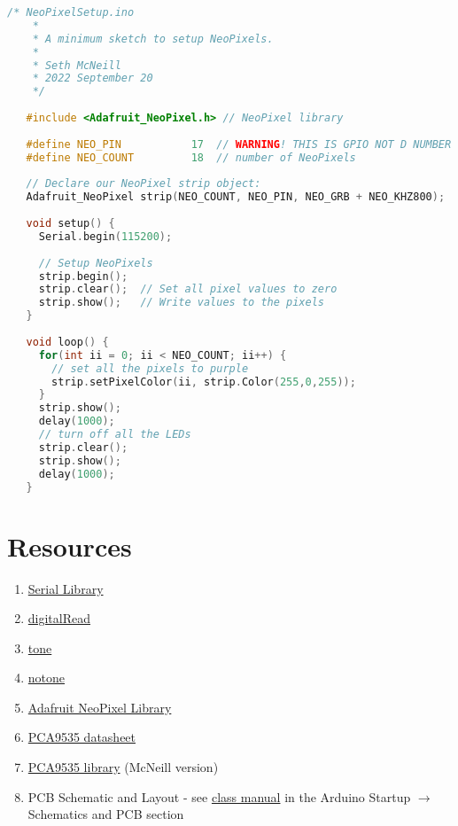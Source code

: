 \begin{lstlisting}[language=C++, caption={This snippet shows how to setup and run the NeoPixels on the board.},label={lst:neopixelsetup}]
    /* NeoPixelSetup.ino
    * 
    * A minimum sketch to setup NeoPixels.
    * 
    * Seth McNeill
    * 2022 September 20
    */
   
   #include <Adafruit_NeoPixel.h> // NeoPixel library
   
   #define NEO_PIN           17  // WARNING! THIS IS GPIO NOT D NUMBER for NeoPixels
   #define NEO_COUNT         18  // number of NeoPixels
   
   // Declare our NeoPixel strip object:
   Adafruit_NeoPixel strip(NEO_COUNT, NEO_PIN, NEO_GRB + NEO_KHZ800);
   
   void setup() {
     Serial.begin(115200);
   
     // Setup NeoPixels
     strip.begin();
     strip.clear();  // Set all pixel values to zero
     strip.show();   // Write values to the pixels
   }
   
   void loop() {
     for(int ii = 0; ii < NEO_COUNT; ii++) {
       // set all the pixels to purple
       strip.setPixelColor(ii, strip.Color(255,0,255));
     }
     strip.show();
     delay(1000);
     // turn off all the LEDs
     strip.clear();
     strip.show();
     delay(1000);
   }   
\end{lstlisting}

\section{Resources}\label{sec:buttonserialresources}
\begin{enumerate}
    \item \href{https://www.arduino.cc/reference/en/language/functions/communication/serial/}{Serial Library}
    \item \href{https://www.arduino.cc/reference/en/language/functions/digital-io/digitalread/}{digitalRead}
    \item \href{https://www.arduino.cc/reference/en/language/functions/advanced-io/tone/}{tone}
    \item \href{https://www.arduino.cc/reference/en/language/functions/advanced-io/notone/}{notone}
    \item \href{https://www.arduino.cc/reference/en/libraries/adafruit-neopixel/}{Adafruit NeoPixel Library}
    \item \href{https://www.nxp.com/docs/en/data-sheet/PCA9535_PCA9535C.pdf}{PCA9535 datasheet}
    \item \href{https://github.com/semcneil/PCA95x5}{PCA9535 library} (McNeill version)
    \item PCB Schematic and Layout - see 
            \href{https://github.com/semcneil/Fundamentals-of-Microcontrollers-Manual}{class manual} 
            in the Arduino Startup $\rightarrow$ Schematics and PCB section
\end{enumerate}

